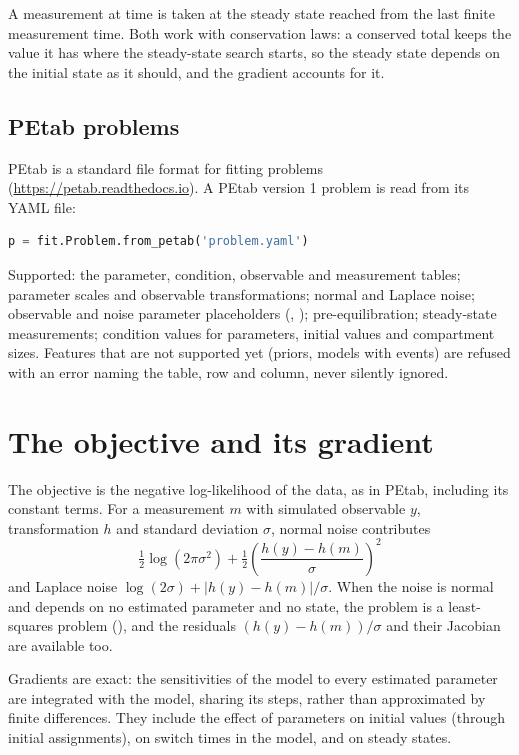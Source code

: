 A measurement at time  is taken at the steady state reached from the last finite measurement time. Both
work with conservation laws: a conserved total keeps the value it has where the steady-state search starts, so
the steady state depends on the initial state as it should, and the gradient accounts for it.

\subsection{PEtab problems}

PEtab is a standard file format for fitting problems (\url{https://petab.readthedocs.io}). A PEtab version 1
problem is read from its YAML file:

\begin{lstlisting}[language=Python]
p = fit.Problem.from_petab('problem.yaml')
\end{lstlisting}

Supported: the parameter, condition, observable and measurement tables; parameter scales and observable
transformations; normal and Laplace noise; observable and noise parameter placeholders
(, ); pre-equilibration; steady-state measurements; condition
values for parameters, initial values and compartment sizes. Features that are not supported yet (priors, models
with events) are refused with an error naming the table, row and column, never silently ignored.

\section{The objective and its gradient}

The objective is the negative log-likelihood of the data, as in PEtab, including its constant terms. For a
measurement $m$ with simulated observable $y$, transformation $h$ and standard deviation $\sigma$, normal noise
contributes
\[
  \tfrac12 \log\left(2\pi\sigma^2\right) + \tfrac12\left(\frac{h(y) - h(m)}{\sigma}\right)^2
\]
and Laplace noise $\log(2\sigma) + |h(y) - h(m)|/\sigma$. When the noise is normal and depends on no estimated
parameter and no state, the problem is a least-squares problem (), and the residuals
$(h(y)-h(m))/\sigma$ and their Jacobian are available too.

Gradients are exact: the sensitivities of the model to every estimated parameter are integrated with the model,
sharing its steps, rather than approximated by finite differences. They include the effect of parameters on
initial values (through initial assignments), on switch times in the model, and on steady states.

